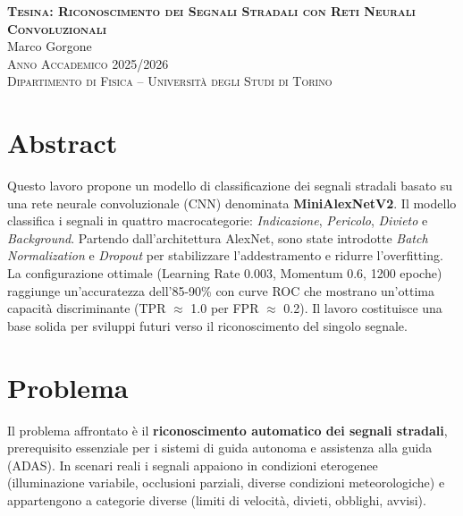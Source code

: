 \documentclass[openany,italian,12pt]{article}
\begin{document}
\thispagestyle{empty}
\begin{center}
\vspace*{2cm}
{\Large\textbf{\textsc{Tesina: Riconoscimento dei Segnali Stradali con Reti Neurali Convoluzionali}}} \\
\vspace{1.5cm}
{\large Marco Gorgone} \\
\vspace{0.5cm}
\textsc{Anno Accademico 2025/2026} \\
\vspace{1cm}
\textsc{Dipartimento di Fisica -- Università degli Studi di Torino}
\end{center}

\newpage

\tableofcontents

\newpage

\section*{Abstract}
Questo lavoro propone un modello di classificazione dei segnali stradali basato su una rete neurale convoluzionale (CNN) denominata \textbf{MiniAlexNetV2}. Il modello classifica i segnali in quattro macrocategorie: \textit{Indicazione}, \textit{Pericolo}, \textit{Divieto} e \textit{Background}. Partendo dall'architettura AlexNet, sono state introdotte \textit{Batch Normalization} e \textit{Dropout} per stabilizzare l'addestramento e ridurre l'overfitting. La configurazione ottimale (Learning Rate 0.003, Momentum 0.6, 1200 epoche) raggiunge un'accuratezza dell'85-90\% con curve ROC che mostrano un'ottima capacità discriminante (TPR $\approx$ 1.0 per FPR $\approx$ 0.2). Il lavoro costituisce una base solida per sviluppi futuri verso il riconoscimento del singolo segnale.

\section*{Problema}
Il problema affrontato è il \textbf{riconoscimento automatico dei segnali stradali}, prerequisito essenziale per i sistemi di guida autonoma e assistenza alla guida (ADAS). In scenari reali i segnali appaiono in condizioni eterogenee (illuminazione variabile, occlusioni parziali, diverse condizioni meteorologiche) e appartengono a categorie diverse (limiti di velocità, divieti, obblighi, avvisi).
\end{document}
